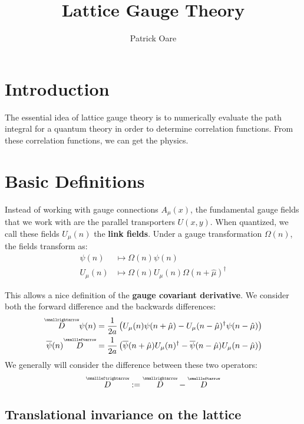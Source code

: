 \documentclass[11pt, oneside]{article}   	%
\title{Lattice Gauge Theory}
\author{Patrick Oare}
\date{}							%
\theoremstyle{definition}
\newcommand{\vecc}[1]{\overset{\scriptscriptstyle\smallrightarrow}{#1}}
\newcommand{\cev}[1]{\overset{\scriptscriptstyle\smallleftarrow}{#1}}
\newcommand{\cevvec}[1]{\overset{\scriptscriptstyle\smallleftrightarrow}{#1}}
\begin{document}
\maketitle

\section{Introduction}

The essential idea of lattice gauge theory is to numerically evaluate the path integral for a quantum theory in order to determine 
correlation functions. From these correlation functions, we can get the physics. 

\section{Basic Definitions}

Instead of working with gauge connections $A_\mu(x)$, the fundamental gauge fields that we work with are the parallel 
transporters $U(x, y)$. When quantized, we call these fields $U_\mu(n)$ the \textbf{link fields}. Under a gauge transformation 
$\Omega(n)$, the fields transform as:
\begin{align}
	\psi(n)&\mapsto \Omega(n)\psi(n) \\
	U_\mu(n)&\mapsto \Omega(n) U_\mu(n) \Omega(n + \hat\mu)^\dagger
\end{align}

This allows a nice definition of the \textbf{gauge covariant derivative}. We consider both the forward difference and the 
backwards differences:
\begin{align}
	\vecc D\psi(n) &= \frac{1}{2a}\left(U_\mu(n)\psi(n + \hat\mu) - U_\mu(n - \hat\mu)^\dagger\psi(n - \hat\mu)\right) \\
	\overline\psi(n) \cev{D}&= \frac{1}{2a}\left(\overline\psi(n + \hat\mu)U_\mu(n)^\dagger - \overline\psi(n - \hat\mu)U_\mu(n - 
	\hat\mu) \right)
\end{align}
We generally will consider the difference between these two operators:
\begin{equation}
	\cevvec{D} := \vecc D - \cev D
\end{equation}

\subsection{Translational invariance on the lattice}
\end{document}
